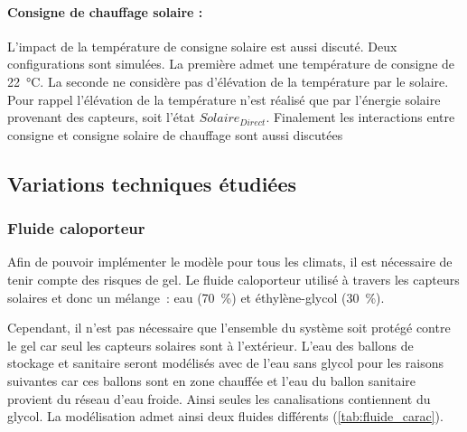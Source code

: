 \paragraph{Consigne de chauffage solaire :} %
\label{par:consigne_de_chauffage_solaire}
L’impact de la température de consigne solaire est aussi discuté. Deux configurations sont
simulées. La première admet une température de consigne de \SI{22}{\celsius}. La
seconde ne considère pas d’élévation de la température par le solaire. Pour rappel
l’élévation de la température n’est réalisé que par l’énergie solaire provenant des
capteurs, soit l’état $Solaire_{Direct}$. Finalement les interactions entre consigne et
consigne solaire de chauffage sont aussi discutées



\subsection{Variations techniques étudiées} %
\label{sub:variations_techniques_etudiees}
\subsubsection{Fluide caloporteur} %
\label{ssub:fluide_caloporteur}
Afin de pouvoir implémenter le modèle pour tous les climats, il est nécessaire de
tenir compte des risques de gel. Le fluide caloporteur utilisé à travers les capteurs
solaires et donc un mélange~: eau (\SI{70}{\percent}) et éthylène-glycol (\SI{30}{\percent}).

Cependant, il n’est pas nécessaire que l’ensemble du système soit protégé contre
le gel car seul les capteurs solaires sont à l’extérieur. L’eau des ballons de stockage
et sanitaire seront modélisés avec de l’eau sans glycol pour les raisons suivantes car
ces ballons sont en zone chauffée et l’eau du ballon sanitaire provient du réseau
d’eau froide. Ainsi seules les canalisations contiennent du glycol.
La modélisation admet ainsi deux fluides différents (\autoref{tab:fluide_carac}).

